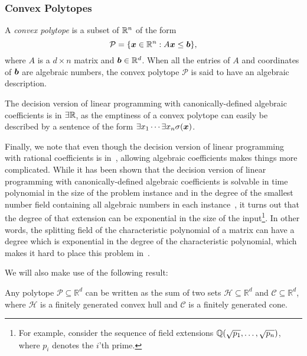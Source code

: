 \subsubsection{Convex Polytopes}

A \emph{convex polytope} is a subset of $\mathbb{R}^{n}$ of the form
\begin{equation*}
\mathcal{P} = \lbrace \boldsymbol{x} \in \mathbb{R}^{n} : A \boldsymbol{x} \leq \boldsymbol{b} \rbrace ,
\end{equation*}
where $A$ is a $d \times n$ matrix and $\boldsymbol{b} \in \mathbb{R}^{d}$. When all the entries of $A$ and coordinates of $\boldsymbol{b}$ are algebraic numbers, the convex polytope $\mathcal{P}$ is said to have an algebraic description.

The decision version of linear programming with canonically-defined algebraic coefficients is in $\exists\mathbb{R}$, as the emptiness of a convex polytope can easily be described by a sentence of the form $\exists x_1 \cdots \exists x_n \sigma(\boldsymbol{x})$.

Finally, we note that even though the decision version of linear
programming with rational coefficients is in~\PTIME{}, allowing
algebraic coefficients makes things more complicated. While it has
been shown that the decision version of linear programming
with canonically-defined algebraic coefficients is solvable in time polynomial
in the size of the problem instance and in the degree of the smallest
number field containing all algebraic numbers in each instance~\cite{AdlerB94}, it
turns out that the degree of that extension can
be exponential in the size of the input\footnote{For example, consider the sequence of field extensions $\mathbb{Q}(\sqrt{p_{1}}, \ldots, \sqrt{p_{n}})$, where $p_{i}$ denotes the $i$'th prime.}. In other words, the splitting
field of the characteristic polynomial of a matrix can have a degree
which is exponential in the degree of the characteristic polynomial, which makes it hard to place this problem in~\PTIME{}.

We will also make use of the following result:
\begin{theorem}
  Any polytope $\mathcal{P} \subseteq \mathbb{R}^{d}$ can be written as the sum of two sets $\mathcal{H} \subseteq \mathbb{R}^{d}$ and $\mathcal{C} \subseteq \mathbb{R}^{d}$, where $\mathcal{H}$ is a finitely generated convex hull and $\mathcal{C}$ is a finitely generated cone.
\end{theorem}
